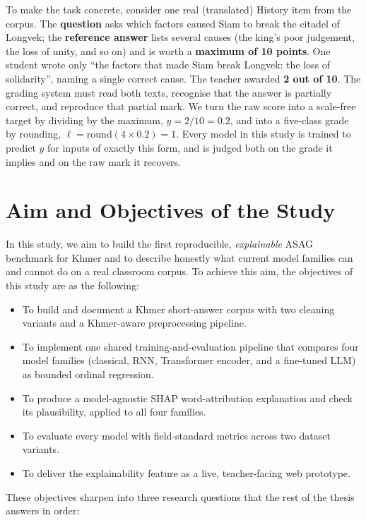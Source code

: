 To make the task concrete, consider one real (translated) History item from the corpus. The
\textbf{question} asks which factors caused Siam to break the citadel of Longvek; the
\textbf{reference answer} lists several causes (the king's poor judgement, the loss of unity, and so
on) and is worth a \textbf{maximum of 10 points}. One student wrote only ``the factors that made Siam
break Longvek: the loss of solidarity'', naming a single correct cause. The teacher awarded
\textbf{2 out of 10}. The grading system must read both texts, recognise that the answer is partially
correct, and reproduce that partial mark. We turn the raw score into a scale-free target by dividing
by the maximum, $y = 2/10 = 0.2$, and into a five-class grade by rounding, $\ell =
\mathrm{round}(4 \times 0.2) = 1$. Every model in this study is trained to predict $y$ for inputs of
exactly this form, and is judged both on the grade it implies and on the raw mark it recovers.

\section{Aim and Objectives of the Study}
In this study, we aim to build the first reproducible, \emph{explainable} ASAG benchmark for Khmer and
to describe honestly what current model families can and cannot do on a real classroom corpus. To
achieve this aim, the objectives of this study are as the following:

\begin{itemize}[leftmargin=1.4em]
  \item To build and document a Khmer short-answer corpus with two cleaning variants and a
  Khmer-aware preprocessing pipeline.
  \item To implement one shared training-and-evaluation pipeline that compares four model families
  (classical, RNN, Transformer encoder, and a fine-tuned LLM) as bounded ordinal regression.
  \item To produce a model-agnostic SHAP word-attribution explanation and check its plausibility,
  applied to all four families.
  \item To evaluate every model with field-standard metrics across two dataset variants.
  \item To deliver the explainability feature as a live, teacher-facing web prototype.
\end{itemize}

These objectives sharpen into three research questions that the rest of the thesis answers in order:

